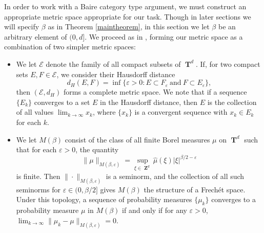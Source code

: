 \documentclass[12pt,reqno]{article}
\numberwithin{equation}{section}
\DeclareMathOperator{\ZZ}{\mathbf{Z}}
\DeclareMathOperator{\TT}{\mathbf{T}}
\begin{document}
In order to work with a Baire category type argument, we must construct an appropriate metric space appropriate for our task. Though in later sections we will specify $\beta$ as in Theorem \ref{maintheorem}, in this section we let $\beta$ be an arbitrary element of $(0,d]$. We proceed as in \cite{Korner2}, forming our metric space as a combination of two simpler metric spaces:
%
\begin{itemize}
    \item We let $\mathcal{E}$ denote the family of all compact subsets of $\TT^d$. If, for two compact sets $E,F \in \mathcal{E}$, we consider their Hausdorff distance
    \[ d_H(E,F) = \inf \{ \varepsilon > 0 : E \subset F_\varepsilon\ \text{and}\ F \subset E_\varepsilon \}, \]
    then $(\mathcal{E},d_H)$ forms a complete metric space. We note that if a sequence $\{ E_k \}$ converges to a set $E$ in the Hausdorff distance, then $E$ is the collection of all values $\lim_{k \to \infty} x_k$, where $\{ x_k \}$ is a convergent sequence with $x_k \in E_k$ for each $k$.

    \item We let $M(\beta)$ consist of the class of all finite Borel measures $\mu$ on $\TT^d$ such that for each $\varepsilon > 0$, the quantity
    \[ \| \mu \|_{M(\beta,\varepsilon)} = \sup_{\xi \in \ZZ^d} \widehat{\mu}(\xi) |\xi|^{\beta/2 - \varepsilon} \]
    is finite. Then $\| \cdot \|_{M(\beta,\varepsilon)}$ is a seminorm, and the collection of all such seminorms for $\varepsilon \in (0,\beta/2]$ gives $M(\beta)$ the structure of a Frech\'{e}t space. Under this topology, a sequence of probability measures $\{ \mu_k \}$ converges to a probability measure $\mu$ in $M(\beta)$ if and only if for any $\varepsilon > 0$, $\lim_{k \to \infty} \| \mu_k - \mu \|_{M(\beta,\varepsilon)} = 0$.
\end{itemize}
\end{document}
